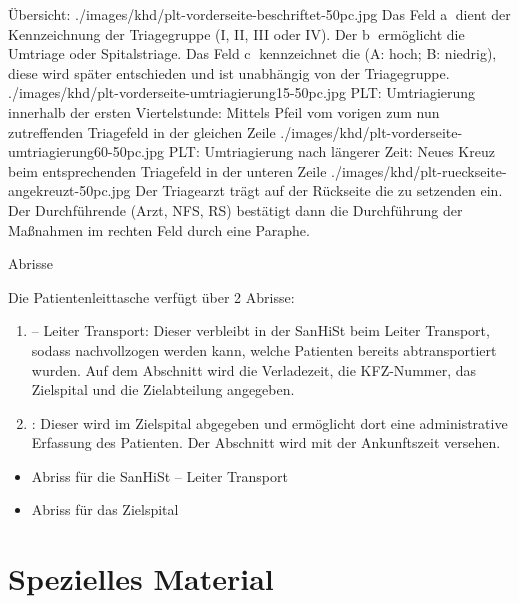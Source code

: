 \begin{PictureSeriesWide}{}{Übersicht: }
{./images/khd/plt-vorderseite-beschriftet-50pc.jpg}
{Das Feld  \textcircled{a} dient der  
Kennzeichnung der Triagegruppe ({\sffamily I}, {\sffamily II},
{\sffamily III} oder {\sffamily IV}). Der  \textcircled{b}
ermöglicht die  Umtriage oder Spitalstriage. Das Feld
 \textcircled{c} kennzeichnet die  
({\sffamily A}: hoch; {\sffamily B}: niedrig), diese wird später
entschieden und ist unabhängig von der Triagegruppe.
}
{./images/khd/plt-vorderseite-umtriagierung15-50pc.jpg}
{PLT: Umtriagierung innerhalb der ersten
Viertelstunde: Mittels Pfeil vom vorigen zum nun zutreffenden Triagefeld in der gleichen Zeile}
{./images/khd/plt-vorderseite-umtriagierung60-50pc.jpg}
{PLT: Umtriagierung nach längerer Zeit: Neues Kreuz beim entsprechenden Triagefeld in der unteren Zeile}
{./images/khd/plt-rueckseite-angekreuzt-50pc.jpg}
{Der Triagearzt trägt auf der Rückseite die zu setzenden
 ein. Der Durchführende (Arzt, NFS, RS) bestätigt
dann die Durchführung der
Maßnahmen im rechten Feld durch eine Paraphe.
}
\end{PictureSeriesWide}

{Abrisse}
{
Die Patientenleittasche verfügt über 2 Abrisse:

\begin{enumerate}
  \item {} -- Leiter Transport: 
  Dieser verbleibt in der SanHiSt beim Leiter Transport, sodass nachvollzogen werden 
  kann, welche Patienten bereits abtransportiert wurden. Auf dem Abschnitt 
  wird die Verladezeit, die KFZ-Nummer, das Zielspital und die Zielabteilung angegeben.
  \item {}: Dieser wird im Zielspital 
  abgegeben und ermöglicht dort eine administrative Erfassung des Patienten. 
  Der Abschnitt wird mit der Ankunftszeit versehen.
\end{enumerate}
}
{
\begin{itemize}
  \item {Abriss für die SanHiSt -- Leiter Transport}
  \item {Abriss für das Zielspital}
\end{itemize}}
{}
{}
{}



\section{Spezielles Material}
\label{topic:katastrophe-material}

